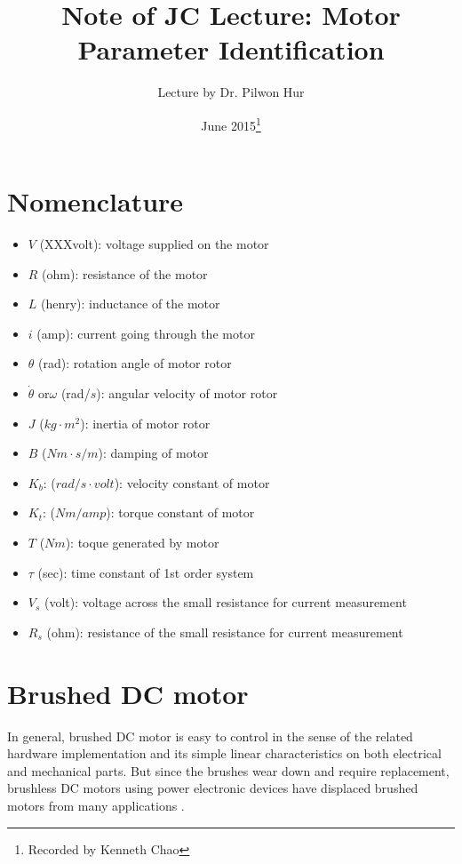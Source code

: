 \documentclass{article}
\title{Note of JC Lecture: Motor Parameter Identification}
\author{Lecture by Dr. Pilwon Hur}
\date{June 2015\footnote{Recorded by Kenneth Chao}}
\begin{document}
\maketitle

\section*{Nomenclature}
\begin{itemize}
\item[] $V$ (XXXvolt): voltage supplied on the motor
\item[] $R$ (ohm): resistance of the motor
\item[] $L$ (henry): inductance of the motor
\item[] $i$ (amp): current going through the motor
\item[] $\theta$ (rad): rotation angle of motor rotor
\item[] $\dot\theta$ or$\omega$ (rad/$s$): angular velocity of motor rotor
\item[] $J$ ($kg\cdot m^2$): inertia of motor rotor
\item[] $B$ ($Nm\cdot s/m$): damping of motor
\item[] $K_b$: ($rad/s\cdot volt$): velocity constant of motor
\item[] $K_t$: ($Nm/amp$): torque constant of motor
\item[] $T$ ($Nm$): toque generated by motor
\item[] $\tau$ (sec): time constant of 1st order system
\item[] $V_s$ (volt): voltage across the small resistance for current measurement
\item[] $R_s$ (ohm): resistance of the small resistance for current measurement
\end{itemize}
\section{Brushed DC motor}
In general, brushed DC motor is easy to control in the sense of the related hardware implementation and its simple linear characteristics on both electrical and mechanical parts. But since the brushes wear down and require replacement, brushless DC motors using power electronic devices have displaced brushed motors from many applications \cite{WikiDCM}.
\end{document}
